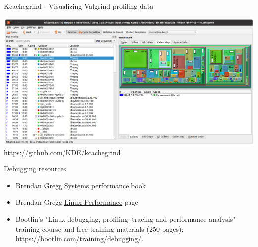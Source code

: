 \begin{frame}{Kcachegrind - Visualizing Valgrind profiling data}
  \begin{center}
    \includegraphics[height=0.7\textheight]{slides/linux-app-memory/kcachegrind.png}
    \url{https://github.com/KDE/kcachegrind}
  \end{center}
\end{frame}

\begin{frame}{Debugging resources}
  \begin{itemize}
  \item Brendan Gregg
    \href{https://www.brendangregg.com/systems-performance-2nd-edition-book.html}{Systems
      performance} book
  \item Brendan Gregg
    \href{https://www.brendangregg.com/linuxperf.html}{Linux
      Performance} page
  \item Bootlin's "Linux debugging, profiling, tracing and performance
        analysis" training course and free training materials
        (250 pages): \url{https://bootlin.com/training/debugging/}.
  \end{itemize}
\end{frame}
